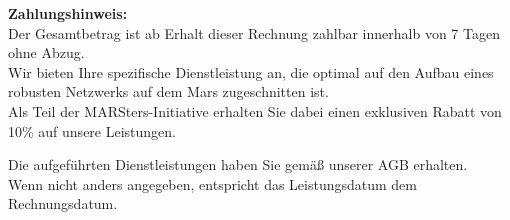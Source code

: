 \documentclass[12pt,a4paper]{article}
\begin{document}
\renewcommand{\arraystretch}{1.4}




\vspace{3.5em}
\fbox{%
  \noindent
  \begin{minipage}[t]{0.48\textwidth}
  \renewcommand{\arraystretch}{1.3}
  \begingroup
    \rowcolors{2}{}{} %
  \begin{tabularx}{\linewidth}{@{}X r@{}}
  
  \end{tabularx}
  \endgroup
  \end{minipage}
}
\vfill

\begin{minipage}[t]{\textwidth}
\small
\textbf{Zahlungshinweis:} \\
Der Gesamtbetrag ist ab Erhalt dieser Rechnung zahlbar innerhalb von 7 Tagen ohne Abzug.\\
Wir bieten Ihre spezifische Dienstleistung an, die optimal auf den Aufbau eines robusten Netzwerks auf dem Mars zugeschnitten ist.\\
Als Teil der MARSters-Initiative erhalten Sie dabei einen exklusiven Rabatt von 10\% auf unsere Leistungen.
\end{minipage}

\vspace{1.5em}

\footnotesize
Die aufgeführten Dienstleistungen haben Sie gemäß unserer AGB erhalten.\\
Wenn nicht anders angegeben, entspricht das Leistungsdatum dem Rechnungsdatum.
\end{document}
